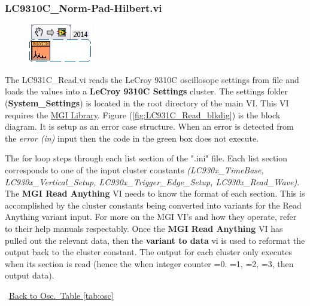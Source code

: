 \documentclass[11pt,a4paper,oldfontcommands]{memoir}
\begin{document}
\subsubsection{LC9310C\_Norm-Pad-Hilbert.vi} \label{LC9310C_nph}
\noindent\hrulefill

\begin{figure}[H]
	\includegraphics[scale=0.625]{LC931C_norm-pad-hilbert_main_01}
	\label{fig:LC9310C_norm-pad-hilbert_main_01}
\end{figure}

The LC931C\_Read.vi reads the LeCroy 9310C oscillosope settings from file and loads the values into a \textbf{LeCroy 9310C Settings} cluster. The settings folder (\textbf{System\_Settings}) is located in the root directory of the main VI. This VI requires the \href{http://sine.ni.com/nips/cds/view/p/lang/en/nid/209753}{MGI Library}. Figure (\ref{fig:LC931C_Read_blkdig}) is the block diagram.  It is setup as an error case structure. When an error is detected from the \textit{error (in)} input then the code in the green box does not execute.

The for loop steps through each list section of the ".ini" file. Each list section corresponds to one of the input cluster constants \textit{(LC930x\_TimeBase, LC930x\_Vertical\_Setup, LC930x\_Trigger\_Edge\_Setup, LC930x\_Read\_Wave)}. The \textbf{MGI Read Anything} VI needs to know the format of each section. This is accomplished by the cluster constants being converted into variants for the Read Anything variant input.  For more on the MGI VI's and how they operate, refer to their help manuals respectably. Once the \textbf{MGI Read Anything} VI has pulled out the relevant data, then the \textbf{variant to data} vi is used to reformat the output back to the cluster constant. The output for each cluster only executes when its section is read (hence the when integer counter =0. =1, =2, =3, then output data). 

\noindent\hrulefill\, \hyperref[tab:osc]{Back to Osc.\ Table \ref{tab:osc}}
\end{document}
